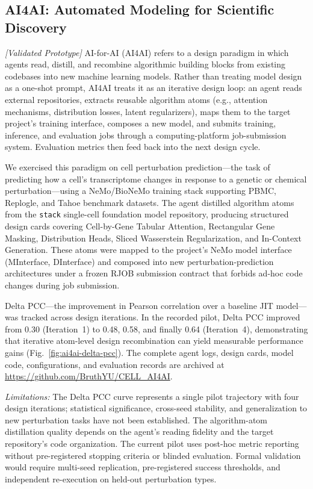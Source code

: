 \documentclass[sn-basic,Numbered,pdflatex]{sn-jnl}
\begin{document}
\FloatBarrier
\subsection{AI4AI: Automated Modeling for Scientific Discovery}

\textit{[Validated Prototype]} AI-for-AI (AI4AI) refers to a design paradigm in which agents read, distill, and recombine algorithmic building blocks from existing codebases into new machine learning models. Rather than treating model design as a one-shot prompt, AI4AI treats it as an iterative design loop: an agent reads external repositories, extracts reusable algorithm atoms (e.g., attention mechanisms, distribution losses, latent regularizers), maps them to the target project's training interface, composes a new model, and submits training, inference, and evaluation jobs through a computing-platform job-submission system. Evaluation metrics then feed back into the next design cycle.

We exercised this paradigm on cell perturbation prediction---the task of predicting how a cell's transcriptome changes in response to a genetic or chemical perturbation---using a NeMo/BioNeMo training stack supporting PBMC, Replogle, and Tahoe benchmark datasets. The agent distilled algorithm atoms from the \texttt{stack} single-cell foundation model repository, producing structured design cards covering Cell-by-Gene Tabular Attention, Rectangular Gene Masking, Distribution Heads, Sliced Wasserstein Regularization, and In-Context Generation. These atoms were mapped to the project's NeMo model interface (MInterface, DInterface) and composed into new perturbation-prediction architectures under a frozen RJOB submission contract that forbids ad-hoc code changes during job submission.

Delta PCC---the improvement in Pearson correlation over a baseline JIT model---was tracked across design iterations. In the recorded pilot, Delta PCC improved from 0.30 (Iteration~1) to 0.48, 0.58, and finally 0.64 (Iteration~4), demonstrating that iterative atom-level design recombination can yield measurable performance gains (Fig.~\ref{fig:ai4ai-delta-pcc}). The complete agent logs, design cards, model code, configurations, and evaluation records are archived at \url{https://github.com/BruthYU/CELL_AI4AI}.

\textit{Limitations:} The Delta PCC curve represents a single pilot trajectory with four design iterations; statistical significance, cross-seed stability, and generalization to new perturbation tasks have not been established. The algorithm-atom distillation quality depends on the agent's reading fidelity and the target repository's code organization. The current pilot uses post-hoc metric reporting without pre-registered stopping criteria or blinded evaluation. Formal validation would require multi-seed replication, pre-registered success thresholds, and independent re-execution on held-out perturbation types.
\end{document}
